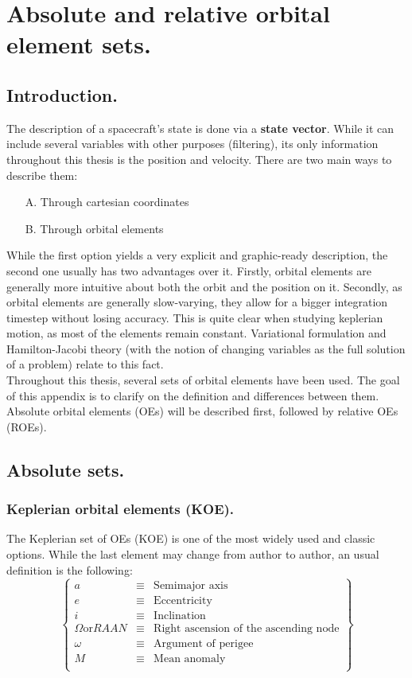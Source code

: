 \chapter{Absolute and relative orbital element sets.}
%
\label{chap: App_OEs}
%
\section{Introduction.}
%
\indent The description of a spacecraft's state is done via a \textbf{state vector}. While it can include several variables with other purposes (\eg filtering), its only information throughout this thesis is the position and velocity. There are two main ways to describe them:\\
%
\begin{itemize}
\item[A.] Through cartesian coordinates
\item[B.] Through orbital elements
\end{itemize}
%
\indent While the first option yields a very explicit and graphic-ready description, the second one usually has two advantages over it. Firstly, orbital elements are generally more intuitive about both the orbit and the position on it. Secondly, as orbital elements are generally slow-varying, they allow for a bigger integration timestep without losing accuracy. This is quite clear when studying keplerian motion, as most of the elements remain constant. Variational formulation and Hamilton-Jacobi theory (with the notion of changing variables as the full solution of a problem) relate to this fact. \\
%
\indent Throughout this thesis, several sets of orbital elements have been used. The goal of this appendix is to clarify on the definition and differences between them. Absolute orbital elements (OEs) will be described first, followed by relative OEs (ROEs).
%
\section{Absolute sets.}
%
	\subsection{Keplerian orbital elements (KOE).}
	\indent The Keplerian set of OEs (KOE) is one of the most widely used and classic options. While the last element may change from author to author, an usual definition is the following:
	\begin{equation}
	\left\{ 
	\begin{array}{lll}
	a & \equiv & \text{Semimajor axis}\\
	e & \equiv & \text{Eccentricity}\\
	i & \equiv & \text{Inclination}\\
	\Omega \text{or} RAAN & \equiv & \text{Right ascension of the ascending node}\\
	\omega & \equiv & \text{Argument of perigee}\\
	M & \equiv & \text{Mean anomaly}\\
	\end{array}
	\right\}
	\end{equation}
